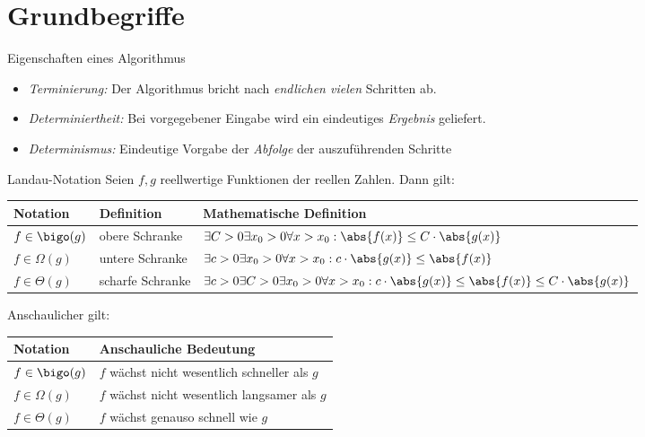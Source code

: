 \section{Grundbegriffe}
\begin{defi}{Eigenschaften eines Algorithmus}
    \begin{itemize}
        \item \emph{Terminierung:} Der Algorithmus bricht nach \emph{endlichen vielen} Schritten ab.
        \item \emph{Determiniertheit:} Bei vorgegebener Eingabe wird ein eindeutiges \emph{Ergebnis} geliefert.
        \item \emph{Determinismus:} Eindeutige Vorgabe der \emph{Abfolge} der auszuführenden Schritte
    \end{itemize}
\end{defi}

\begin{defi}{Landau-Notation}
    Seien $f, g$ reellwertige Funktionen der reellen Zahlen.
    Dann gilt: \cite{wiki:Landau-Symbole}

    \begin{tabular}{l|l|l}
        Notation          & Definition       & Mathematische Definition                                                                                                  \\
        \hline
        $f \in \bigo(g)$  & obere Schranke   & $\exists C > 0 \exists x_0 > 0 \forall x > x_0 : \abs{f(x)} \leq C \cdot \abs{g(x)}$                                      \\
        $f \in \Omega(g)$ & untere Schranke  & $\exists c > 0 \exists x_0 > 0 \forall x > x_0 : c\cdot \abs{g(x)} \leq \abs{f(x)}$                                       \\
        $f \in \Theta(g)$ & scharfe Schranke & $\exists c > 0 \exists C > 0 \exists x_0 > 0 \forall x > x_0 : c\cdot \abs{g(x)} \leq \abs{f(x)} \leq C \cdot \abs{g(x)}$ \\
    \end{tabular}

    Anschaulicher gilt:

    \begin{tabular}{l|l}
        Notation          & Anschauliche Bedeutung                        \\
        \hline
        $f \in \bigo(g)$  & $f$ wächst nicht wesentlich schneller als $g$ \\
        $f \in \Omega(g)$ & $f$ wächst nicht wesentlich langsamer als $g$ \\
        $f \in \Theta(g)$ & $f$ wächst genauso schnell wie $g$
    \end{tabular}
\end{defi}

